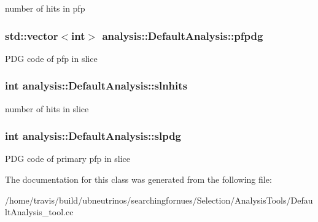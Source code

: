 number of hits in pfp \hypertarget{classanalysis_1_1DefaultAnalysis_a5d3ad6cd0930367cafe48e485aa19d20}{
\subsubsection[{pfpdg}]{\setlength{\rightskip}{0pt plus 5cm}std\-::vector$<$int$>$ analysis\-::\-Default\-Analysis\-::pfpdg\hspace{0.3cm}{\ttfamily [private]}}}\label{classanalysis_1_1DefaultAnalysis_a5d3ad6cd0930367cafe48e485aa19d20}
P\-D\-G code of pfp in slice \hypertarget{classanalysis_1_1DefaultAnalysis_a9f003b22425d9db3b27eabee64700028}{
\subsubsection[{slnhits}]{\setlength{\rightskip}{0pt plus 5cm}int analysis\-::\-Default\-Analysis\-::slnhits\hspace{0.3cm}{\ttfamily [private]}}}\label{classanalysis_1_1DefaultAnalysis_a9f003b22425d9db3b27eabee64700028}
number of hits in slice \hypertarget{classanalysis_1_1DefaultAnalysis_a9763429d7ed32c67e96d981d14893c06}{
\subsubsection[{slpdg}]{\setlength{\rightskip}{0pt plus 5cm}int analysis\-::\-Default\-Analysis\-::slpdg\hspace{0.3cm}{\ttfamily [private]}}}\label{classanalysis_1_1DefaultAnalysis_a9763429d7ed32c67e96d981d14893c06}
P\-D\-G code of primary pfp in slice 

The documentation for this class was generated from the following file\-:\begin{DoxyCompactItemize}
\item 
/home/travis/build/ubneutrinos/searchingfornues/\-Selection/\-Analysis\-Tools/Default\-Analysis\-\_\-tool.\-cc\end{DoxyCompactItemize}
